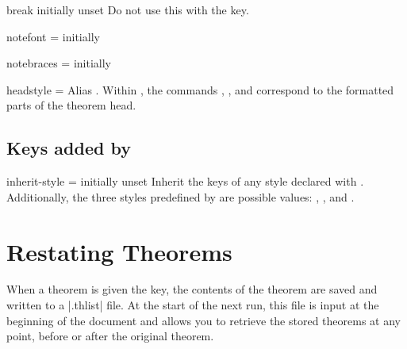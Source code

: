 \documentclass{ltxdoc}
\newcommand{\ttbraces}[1]{\braces{\texttt{#1}}}
\begin{document}
\begin{docKey}{break}
  {}
  {initially unset}
Do not use this with the  key.
\end{docKey}

\begin{docKey}{notefont}
  {=}
  {initially }

\end{docKey}

\begin{docKey}{notebraces}
  {=}
  {initially \ttbraces{(}\ttbraces{)}}

\end{docKey}

\begin{docKey}{headstyle}
  {=\textbar{}\textbar{}}
  {}
Alias . Within , the commands , , and  correspond to the formatted parts of the theorem head.
\end{docKey}

\subsection{Keys added by }

\begin{docKey}{inherit-style}
  {=}
  {initially unset}
Inherit the keys of any style declared with . Additionally, the three styles predefined by  are possible values: , , and .
\end{docKey}

\section{Restating Theorems}

When a theorem is given the  key, the contents of the theorem are saved and written to a |.thlist| file. At the start of the next run, this file is input at the beginning of the document and allows you to retrieve the stored theorems at any point, before or after the original theorem.
\end{document}
